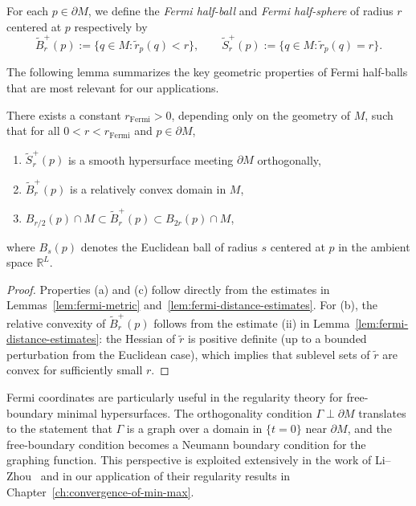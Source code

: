 \begin{definition}\label{def:fermi-balls}
For each $p \in \partial M$, we define the \emph{Fermi half-ball} and \emph{Fermi half-sphere}
of radius $r$ centered at $p$ respectively by
\[
\tilde B^+_r(p):= \{ q \in M : \tilde r_p(q) < r \}, \qquad
\tilde S^+_r(p):=\{ q \in M : \tilde r_p(q) = r \}.
\]
\end{definition}

The following lemma summarizes the key geometric properties of Fermi half-balls that are most
relevant for our applications.

\begin{lemma}\label{lem:fermi-balls-properties}
There exists a constant $r_{\mathrm{Fermi}}>0$, depending only on the geometry of $M$, such that
for all $0<r<r_{\mathrm{Fermi}}$ and $p\in\partial M$,
\begin{enumerate}[label=(\alph*)]
\item $\tilde S^+_r(p)$ is a smooth hypersurface meeting $\partial M$ orthogonally,
\item $\tilde B^+_r(p)$ is a relatively convex domain in $M$,
\item $B_{r/2}(p) \cap M \subset \tilde B^+_r(p) \subset B_{2r}(p) \cap M$,
\end{enumerate}
where $B_s(p)$ denotes the Euclidean ball of radius $s$ centered at $p$ in the ambient space
$\mathbb{R}^L$.
\end{lemma}

\begin{proof}
Properties (a) and (c) follow directly from the estimates in Lemmas~\ref{lem:fermi-metric}
and~\ref{lem:fermi-distance-estimates}. For (b), the relative convexity of $\tilde B^+_r(p)$
follows from the estimate (ii) in Lemma~\ref{lem:fermi-distance-estimates}: the Hessian of
$\tilde r$ is positive definite (up to a bounded perturbation from the Euclidean case), which
implies that sublevel sets of $\tilde r$ are convex for sufficiently small $r$.
\end{proof}

\begin{remark}
Fermi coordinates are particularly useful in the regularity theory for free-boundary minimal
hypersurfaces. The orthogonality condition $\Gamma\perp\partial M$ translates to the statement
that $\Gamma$ is a graph over a domain in $\{t=0\}$ near $\partial M$, and the free-boundary
condition becomes a Neumann boundary condition for the graphing function. This perspective is
exploited extensively in the work of Li--Zhou~\cite{LZ17} and in our application of their
regularity results in Chapter~\ref{ch:convergence-of-min-max}.
\end{remark}

